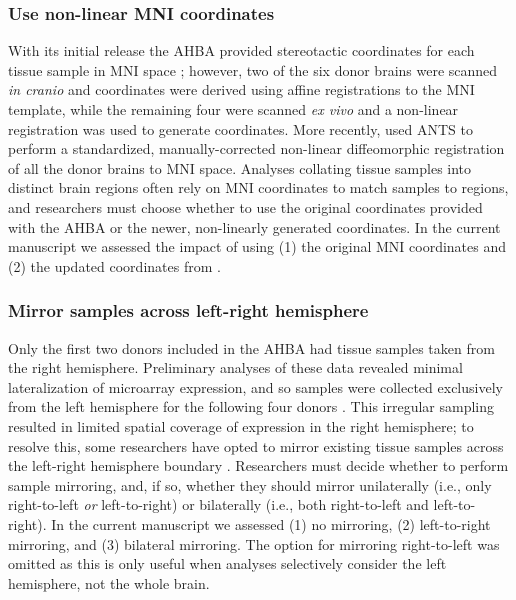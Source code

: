 \documentclass[12pt,aps,pra,reprint,showkeys]{revtex4-1}
\begin{document}
\subsubsection*{Use non-linear MNI coordinates}

With its initial release the AHBA provided stereotactic coordinates for each tissue sample in MNI space \citep{fonov2009neuroimage, fonov2011neuroimage, collins1999animal}; however, two of the six donor brains were scanned \emph{in cranio} and coordinates were derived using affine registrations to the MNI template, while the remaining four were scanned \emph{ex vivo} and a non-linear registration was used to generate coordinates.
More recently, \citet{gorgolewski2014f1000} used ANTS \citep{avants2011neuroimage} to perform a standardized, manually-corrected non-linear diffeomorphic registration of all the donor brains to MNI space.
Analyses collating tissue samples into distinct brain regions often rely on MNI coordinates to match samples to regions, and researchers must choose whether to use the original coordinates provided with the AHBA or the newer, non-linearly generated coordinates.
In the current manuscript we assessed the impact of using (1) the original MNI coordinates and (2) the updated coordinates from \citet{gorgolewski2014f1000}.

\subsubsection*{Mirror samples across left-right hemisphere}

Only the first two donors included in the AHBA had tissue samples taken from the right hemisphere.
Preliminary analyses of these data revealed minimal lateralization of microarray expression, and so samples were collected exclusively from the left hemisphere for the following four donors \citep{hawrylycz2012nature, hawrylycz2015natneuro}.
This irregular sampling resulted in limited spatial coverage of expression in the right hemisphere; to resolve this, some researchers have opted to mirror existing tissue samples across the left-right hemisphere boundary \citep{romerogarcia2018neuroimage}.
Researchers must decide whether to perform sample mirroring, and, if so, whether they should mirror unilaterally (i.e., only right-to-left \emph{or} left-to-right) or bilaterally (i.e., both right-to-left and left-to-right).
In the current manuscript we assessed (1) no mirroring, (2) left-to-right mirroring, and (3) bilateral mirroring.
The option for mirroring right-to-left was omitted as this is only useful when analyses selectively consider the left hemisphere, not the whole brain.
\end{document}
